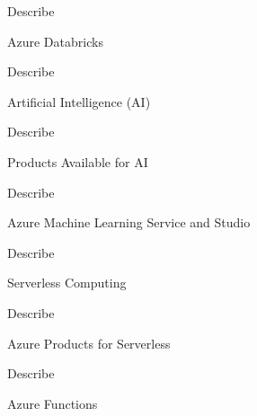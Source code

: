 \documentclass{scrartcl}
\newenvironment{flashcard}[2][]{%
    #1
    \vfill
    \centerline{\Large{#2}}
    \vfill
    \newpage
}
{\newpage}
\begin{document}
    \begin{flashcard}[Describe]{Azure Databricks}

    \end{flashcard}

    \begin{flashcard}[Describe]{Artificial Intelligence (AI)}

    \end{flashcard}

    \begin{flashcard}[Describe]{Products Available for AI}

    \end{flashcard}

    \begin{flashcard}[Describe]{Azure Machine Learning Service and Studio}

    \end{flashcard}

    \begin{flashcard}[Describe]{Serverless Computing}

    \end{flashcard}

    \begin{flashcard}[Describe]{Azure Products for Serverless}

    \end{flashcard}

    \begin{flashcard}[Describe]{Azure Functions}

    \end{flashcard}
\end{document}
